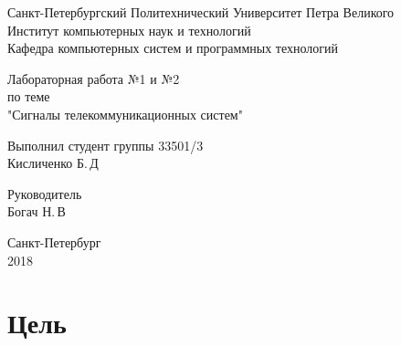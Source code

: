 \documentclass[12pt,a4paper]{scrartcl}
\begin{document}
\begin{titlepage}
  \begin{center}
    Санкт-Петербургский Политехнический Университет     Петра Великого \\
    
    Институт компьютерных наук и технологий \\
    
    Кафедра компьютерных систем и программных технологий
  \end{center}
  
  \vfill
  
  \begin{center}
  Лабораторная работа №1 и №2\\
  по теме\\
  "Сигналы телекоммуникационных
систем"\\
\end{center}

\vfill

\newlength{\ML}
\hfill\begin{minipage}{0.4\textwidth}
  Выполнил студент группы 33501/3\\
  \underline{\hspace{\ML}} Кисличенко Б.\,Д\\
\end{minipage}%

\bigskip

\hfill\begin{minipage}{0.4\textwidth}
  Руководитель\\
  \underline{\hspace{\ML}} Богач Н.\,В\\
\end{minipage}%

\vfill
 
\begin{center}
  Санкт-Петербург\\
2018 
\end{center}

\end{titlepage}

\section{Цель}
\label{sec:goal}
\end{document}
